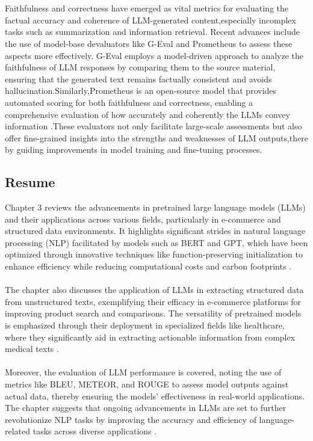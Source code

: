 \\\\
Faithfulness and correctness have emerged as vital metrics for evaluating the factual accuracy and coherence of LLM-generated content,especially incomplex tasks such as summarization and information retrieval. Recent advances include the use of model-base devaluators like G-Eval and Prometheus to assess these aspects more effectively. G-Eval employs a model-driven approach to analyze the faithfulness of LLM responses by comparing them to the source material, ensuring that the generated text remains factually consistent and avoids hallucination.Similarly,Prometheus is an open-source model that provides automated scoring for both faithfulness and correctness, enabling a comprehensive evaluation of how accurately and coherently the LLMs convey information \cite{kim2024prometheus2opensource}.These evaluators not only facilitate large-scale assessments but also offer fine-grained insights into the strengths and weaknesses of LLM outputs,there by guiding improvements in model training and fine-tuning processes.
\subsection{Resume}
Chapter 3 reviews the advancements in pretrained large language models (LLMs) and their applications across various fields, particularly in e-commerce and structured data environments. It highlights significant strides in natural language processing (NLP) facilitated by models such as BERT and GPT, which have been optimized through innovative techniques like function-preserving initialization to enhance efficiency while reducing computational costs and carbon footprints .
\\\\
The chapter also discusses the application of LLMs in extracting structured data from unstructured texts, exemplifying their efficacy in e-commerce platforms for improving product search and comparisons. The versatility of pretrained models is emphasized through their deployment in specialized fields like healthcare, where they significantly aid in extracting actionable information from complex medical texts .
\\\\
Moreover, the evaluation of LLM performance is covered, noting the use of metrics like BLEU, METEOR, and ROUGE to assess model outputs against actual data, thereby ensuring the models' effectiveness in real-world applications. The chapter suggests that ongoing advancements in LLMs are set to further revolutionize NLP tasks by improving the accuracy and efficiency of language-related tasks across diverse applications .